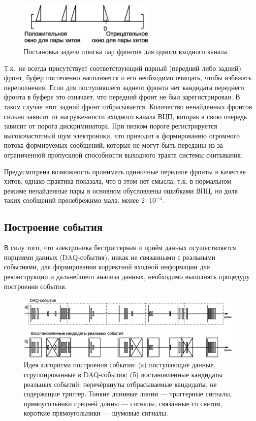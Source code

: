 \begin{figure}
\includegraphics[width=0.6\textwidth]{pictures/14_Edge_matching_rus.eps}
\caption{Постановка задачи поиска пар фронтов для одного входного канала.}
\label{fig:EdgeMatching}
\end{figure}

Т.к.~не всегда присутствует соответствующий парный (передний либо задний) фронт, буфер постепенно наполняется и его необходимо очищать, чтобы избежать переполнения. Если для поступившего заднего фронта нет кандидата переднего фронта в буфере это означает, что передний фронт не был зарегистрирован. В таком случае этот задний фронт отбрасывается. Количество ненайденных фронтов сильно зависит от нагруженности входного канала ВЦП, которая в свою очередь зависит от порога дискриминатора. При низком пороге регистрируется высокочастотный шум электроники, что приводит к формированию огромного потока формируемых сообщений, которые не могут быть переданы из-за ограниченной пропускной способности выходного тракта системы считывания.

Предусмотрена возможность принимать одиночные передние фронты в качестве хитов, однако практика показала, что в этом нет смысла, т.к. в нормальном режиме ненайденные пары в основном обусловлены ошибками ВПЦ, но доля таких сообщений пренебрежимо мала, менее $ 2 \cdot 10^{-4} $.

\subsection{Построение события}

В силу того, что электроника бестриггерная и приём данных осуществляется порциями данных (DAQ-события), никак не связанными с реальными событиями, для формирования корректной входной информации для реконструкции и дальнейшего анализа данных, необходимо выполнять процедуру построения события.

\begin{figure}
\includegraphics[width=1.0\textwidth]{pictures/15_Event_building_rus_bw.eps}
\caption{Идея алгоритма построения события: (а) поступающие данные, сгруппированные в DAQ-события; (б) востановленные кандидаты реальных событий; перечёркнуты отбрасываемые кандидаты, не содержащие триггер. Тонкие длинные линии --- триггерные сигналы, прямоугольники средней длины --- сигналы, связанные со светом, короткие прямоугольники --- шумовые сигналы.}
\label{fig:EventBuilding}
\end{figure}

